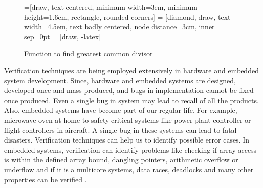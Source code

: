 \begin{figure}[h]
    \centering
    =[draw, text centered, minimum width=3em, minimum height=1.6em, rectangle, rounded corners]
     = [diamond, draw, text width=4.5em, text badly centered, node distance=3cm, inner sep=0pt]
    =[draw, -latex]
   \caption{Function to find greatest common divisor}
   \label{fig:example:test:coverage:code}
\end{figure}

Verification techniques are being employed extensively in hardware and embedded system development. Since, hardware and embedded systems are designed, developed once and mass produced, and bugs in implementation cannot be fixed once produced. Even a single bug in system may lead to recall of all the products. Also, embedded systems have become part of our regular life. For example, microwave oven at home to safety critical systems like power plant controller or flight controllers in aircraft. A single bug in these systems can lead to fatal disasters. Verification techniques can help us to identify possible error cases. In embedded systems, verification can identify problems like checking if array access is within the defined array bound, dangling pointers, arithmetic overflow or underflow and if it is a multicore systems, data races, deadlocks and many other properties can be verified \cite{werner2010correctness, post2007integrated, vasudevan2008static}.


